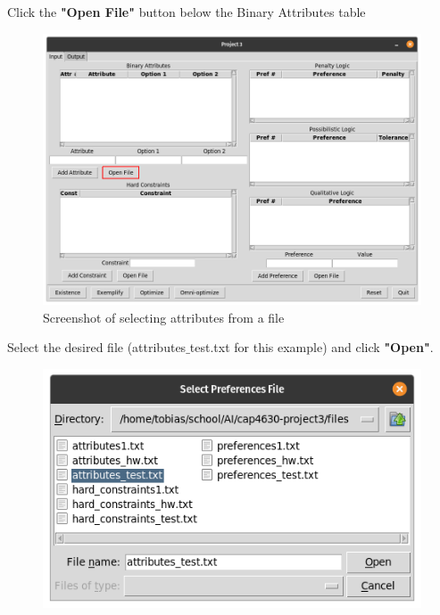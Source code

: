 \documentclass[12pt]{report}
\begin{document}
\begin{description}[leftmargin=4em]
\item [Step 1:] Click the \textbf{"Open File"} button below the Binary Attributes table
\begin{figure}[H]
\begin{center}
\includegraphics[scale=0.275,trim=1cm 1cm 1cm 1cm]{input_attributes}
\caption{Screenshot of selecting attributes from a file}
\end{center}
\end{figure}
\vspace{-2.5em}
\item [Step 2:] Select the desired file (attributes$\_$test.txt for this example) and click \textbf{"Open"}.
\begin{figure}[H]
\begin{center}
\includegraphics[scale=0.3,trim=1cm 1cm 1cm 1cm]{select_attributes}

\end{center}
\end{figure}
\end{description}
\end{document}
